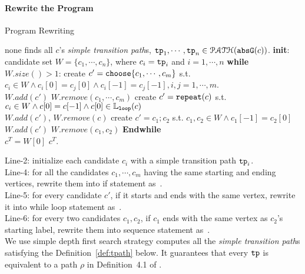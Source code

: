 \paragraph{Rewrite the Program}
\begin{algorithm}
  \caption*{Program Rewriting}
  \label{alg:alg-refine_rewrite}
  \begin{algorithmic}[1]
    \REQUIRE none
    \STATE finds all $c$'s \emph{simple transition path}s, $\mathtt{tp}_1, \cdots, \mathtt{tp}_n \in \mathcal{PATH}(\mathtt{abs}{\mathtt{G}}(c))$.
    \STATE \textbf{init}: candidate set $W = \{c_1, \cdots, c_n\}$, where $c_i = \mathtt{tp}_i$ and $i = 1, \cdots, n$
    \STATE \textbf{while} $W.size()> 1$:
    \STATE \quad create $c' = \rpchoose{c_1, \cdots, c_m}$ 
    s.t. $c_i \in W \land c_i[0] = c_j[0] \land c_i[-1] = c_j[-1], i, j = 1, \cdots, m$.
    \\ \quad $W.add(c')$ \qquad $W.remove(c_1, \cdots, c_m)$
    \STATE
    \quad create $c' = \mathtt{repeat}(c)$ s.t. $c_i \in W \land c[0] = c[-1] \land c[0] \in \mathbb{L}_{\mathtt{loop}}(c)$
    \\ \quad $W.add(c')$, \qquad $W.remove(c)$
    \STATE \quad create $c' = c_1; c_2$ s.t. $c_1, c_2 \in W \land c_1[-1] = c_2[0]$
    \\
    \quad $W.add(c')$ \qquad $W.remove(c_1, c_2)$
    \STATE \textbf{Endwhile}
    \\ $c^T = W[0]$
    \RETURN $c^T$.
\end{algorithmic}
\end{algorithm}
%
Line-2: initialize each candidate $c_i$ with a simple transition path $\mathtt{tp}_i$.
\\
Line-4: for all the candidates $c_1, \cdots, c_m$ having the same starting and ending vertices, rewrite them into if statement as~\cite{GulwaniJK09}.
\\
Line-5: for every candidate $c'$, if it starts and ends with the same vertex, rewrite it into while loop statement as~\cite{GulwaniJK09}.
\\
Line-6: for every two candidates $c_1, c_2$, if $c_1$ ends with the same vertex as $c_2$'s starting label, rewrite them into sequence statement as~\cite{GulwaniJK09}.
\\
We use simple depth first search strategy computes all the \emph{simple transition path}s satisfying the Definition~\ref{def:tpath} below.
It guarantees that  every $\mathtt{tp}$ is equivalent to a path $\rho$ in Definition~4.1 of \cite{GulwaniJK09}.
